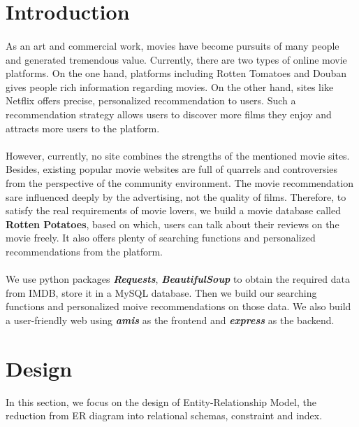 \begin{CJK*}{UTF8}{gbsn}
\begin{titlepage}
    \vfill
    
\end{titlepage}

\tableofcontents
\pagebreak

\rmfamily
\section{Introduction}
\paragraph{}As an art and commercial work, movies have become pursuits of many people and generated tremendous value. Currently, there are two types of online movie platforms. On the one hand, platforms including Rotten Tomatoes and Douban gives people rich information regarding movies. On the other hand, sites like Netflix offers precise, personalized recommendation to users. Such a recommendation strategy allows users to discover more films they enjoy and attracts more users to the platform.
\paragraph{}However, currently, no site combines the strengths of the mentioned movie sites. Besides, existing popular movie websites are full of quarrels and controversies from the perspective of the community environment. The movie recommendation sare influenced deeply by the advertising, not the quality of films. Therefore, to satisfy the real requirements of movie lovers, we build a movie database called \textbf{Rotten Potatoes}, based on which, users can talk about their reviews on the movie freely. It also offers plenty of searching functions and personalized recommendations from the platform. 
\paragraph{}We use python packages \textbf{\textit{Requests}}, \textbf{\textit{BeautifulSoup}} to obtain the required data from IMDB, store it in a MySQL database. Then we build our searching functions and personalized moive recommendations on those data. We also build a user-friendly web using \textbf{\textit{amis}} as the frontend and \textbf{\textit{express}} as the backend.
\section{Design}
In this section, we focus on the design of Entity-Relationship Model, 
the reduction from ER diagram into relational schemas, constraint and index.


\end{CJK*}
